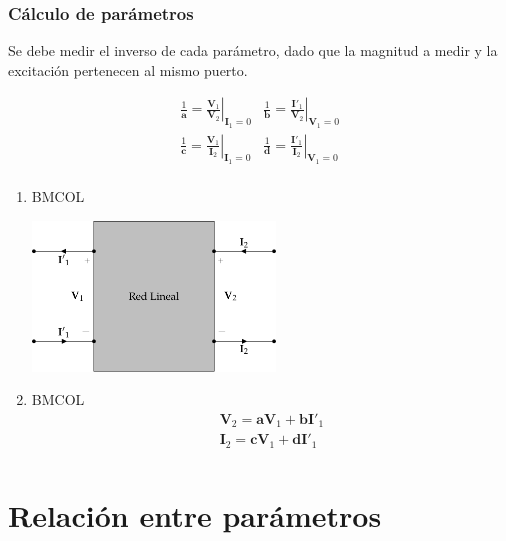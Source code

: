 \subsubsection{Cálculo de parámetros}
\label{sec:org67b01c0}
Se debe medir el inverso de cada parámetro, dado que la magnitud a medir y la excitación pertenecen al mismo puerto.

\renewcommand{\arraystretch}{3}
\[
  \begin{array}{cc}
    \frac{1}{\mathbf{a}} = \left.\frac{\mathbf{V}_1}{\mathbf{V}_2}\right\rvert_{\mathbf{I}_1 = 0} &
    \frac{1}{\mathbf{b}} = \left.\frac{\mathbf{I'}_1}{\mathbf{V}_2}\right\rvert_{\mathbf{V}_1 = 0}\\
    \frac{1}{\mathbf{c}} = \left.\frac{\mathbf{V}_1}{\mathbf{I}_2}\right\rvert_{\mathbf{I}_1 = 0} &
    \frac{1}{\mathbf{d}} = \left.\frac{\mathbf{I'}_1}{\mathbf{I}_2}\right\rvert_{\mathbf{V}_1 = 0}\\
  \end{array}
\]

\begin{enumerate}
\item \hfill{}\textsc{BMCOL}
\label{sec:org770263e}
\begin{center}
\includegraphics[height=4cm]{../figs/cuadripolo_transmision_inversa.pdf}
\end{center}

\item \hfill{}\textsc{BMCOL}
\label{sec:orgc57f0bc}
\renewcommand{\arraystretch}{1}
\[
\begin{array}{l}
  \mathbf{V}_2 = \mathbf{a} \mathbf{V}_1 + \mathbf{b}\mathbf{I'}_1\\
  \mathbf{I}_2 = \mathbf{c} \mathbf{V}_1 + \mathbf{d} \mathbf{I'}_1\\
\end{array}
\]
\end{enumerate}


\section{Relación entre parámetros}
\label{sec:org2eae33c}

